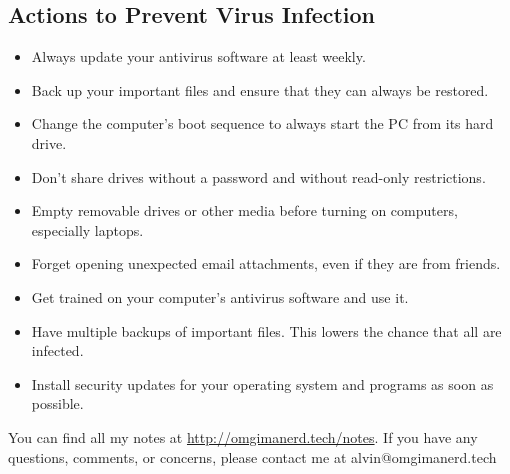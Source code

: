 \documentclass{math}
\begin{document}
\subsection*{Actions to Prevent Virus Infection}
\begin{itemize}
  \item Always update your antivirus software at least weekly.
  \item Back up your important files and ensure that they can always be
    restored.
  \item Change the computer's boot sequence to always start the PC from its hard
    drive.
  \item Don't share drives without a password and without read-only
    restrictions.
  \item Empty removable drives or other media before turning on computers,
    especially laptops.
  \item Forget opening unexpected email attachments, even if they are from
    friends.
  \item Get trained on your computer's antivirus software and use it.
  \item Have multiple backups of important files. This lowers the chance that
    all are infected.
  \item Install security updates for your operating system and programs as soon
    as possible.
\end{itemize}

\begin{center}
  You can find all my notes at \url{http://omgimanerd.tech/notes}. If you have
  any questions, comments, or concerns, please contact me at
  alvin@omgimanerd.tech
\end{center}
\end{document}
